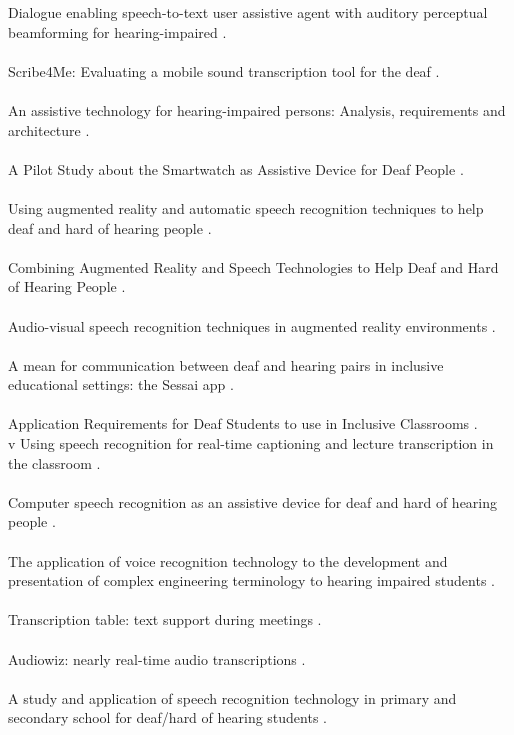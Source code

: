 \documentclass[english, 12pt, a4paper, pdftex, elec, utf8]{aaltothesis}
\begin{document}
Dialogue enabling speech-to-text user assistive agent with auditory perceptual beamforming for hearing-impaired \cite{lee2013dialogue}. \\\\
Scribe4Me: Evaluating a mobile sound transcription tool for the deaf \cite{matthews2006scribe4me}. \\\\
An assistive technology for hearing-impaired persons: Analysis, requirements and architecture \cite{mielke2013assistive}. \\\\
A Pilot Study about the Smartwatch as Assistive Device for Deaf People \cite{mielke2015pilot}. \\\\
Using augmented reality and automatic speech recognition techniques to help deaf and hard of hearing people \cite{mirzaei2012}. \\\\
Combining Augmented Reality and Speech Technologies to Help Deaf and Hard of Hearing People \cite{mirzaei2012combining}. \\\\
Audio-visual speech recognition techniques in augmented reality environments \cite{mirzaei2014audio}. \\\\
A mean for communication between deaf and hearing pairs in inclusive educational settings: the Sessai app \cite{prietch2015mean}. \\\\
Application Requirements for Deaf Students to use in Inclusive Classrooms \cite{prietch2015application}. \\v
Using speech recognition for real-time captioning and lecture transcription in the classroom \cite{ranchal2013using}. \\\\
Computer speech recognition as an assistive device for deaf and hard of hearing people \cite{robison1996computer}. \\\\
The application of voice recognition technology to the development and presentation of complex engineering terminology to hearing impaired students \cite{stewart2003application}. \\\\
Transcription table: text support during meetings \cite{van2005transcription}. \\\\
Audiowiz: nearly real-time audio transcriptions \cite{white2010audiowiz}. \\\\
A study and application of speech recognition technology in primary and secondary school for deaf/hard of hearing students \cite{zhili2010study}. \\
\end{document}
